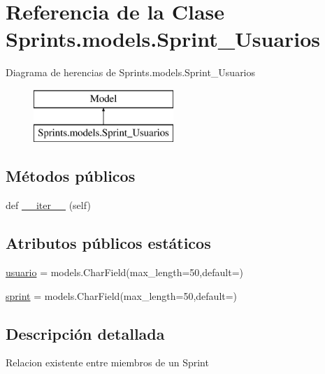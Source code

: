 \hypertarget{class_sprints_1_1models_1_1_sprint___usuarios}{}\section{Referencia de la Clase Sprints.\+models.\+Sprint\+\_\+\+Usuarios}
\label{class_sprints_1_1models_1_1_sprint___usuarios}
Diagrama de herencias de Sprints.\+models.\+Sprint\+\_\+\+Usuarios\begin{figure}[H]
\begin{center}
\leavevmode
\includegraphics[height=2.000000cm]{class_sprints_1_1models_1_1_sprint___usuarios}
\end{center}
\end{figure}
\subsection*{Métodos públicos}
\begin{DoxyCompactItemize}
\item 
def \hyperlink{class_sprints_1_1models_1_1_sprint___usuarios_a86c9f518797d61bc686e540252759091}{\+\_\+\+\_\+iter\+\_\+\+\_\+} (self)
\end{DoxyCompactItemize}
\subsection*{Atributos públicos estáticos}
\begin{DoxyCompactItemize}
\item 
\hyperlink{class_sprints_1_1models_1_1_sprint___usuarios_a729789d5d79eb2798af64656e6ff5ece}{usuario} = models.\+Char\+Field(max\+\_\+length=50,default=\textquotesingle{}\textquotesingle{})
\item 
\hyperlink{class_sprints_1_1models_1_1_sprint___usuarios_ad83f74f58255bed44013d2266382c609}{sprint} = models.\+Char\+Field(max\+\_\+length=50,default=\textquotesingle{}\textquotesingle{})
\end{DoxyCompactItemize}


\subsection{Descripción detallada}
\begin{DoxyVerb}Relacion existente entre miembros de un Sprint\end{DoxyVerb}
 

